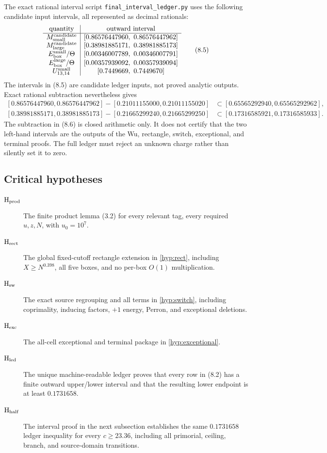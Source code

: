 \documentclass[11pt]{article}
\theoremstyle{definition}
\newcommand{\cert}[1]{\texttt{#1}}
\begin{document}
The exact rational interval script \cert{final\_interval\_ledger.py} uses
the following candidate input intervals, all represented as decimal
rationals:
\[
\begin{array}{c|c}
\text{quantity}&\text{outward interval}\\
\hline
M_{\rm small}^{\rm candidate}
 &[0.86576447960,\ 0.86576447962]\\
M_{\rm large}^{\rm candidate}
 &[0.38981885171,\ 0.38981885173]\\
E_{\rm box}^{\rm small}/\Theta
 &[0.00346007789,\ 0.00346007791]\\
E_{\rm box}^{\rm large}/\Theta
 &[0.00357939092,\ 0.00357939094]\\
U_{13,14}^{\rm small}&[0.7449669,\ 0.7449670]
\end{array}
\tag{8.5}
\]
The intervals in (8.5) are candidate ledger inputs, not proved analytic
outputs.  Exact rational subtraction nevertheless gives
\small
\[
\begin{aligned}
 [0.86576447960,0.86576447962]
 -[0.21011155000,0.21011155020]
 &\subset[0.65565292940,0.65565292962],\\
 [0.38981885171,0.38981885173]
 -[0.21665299240,0.21665299250]
 &\subset[0.17316585921,0.17316585933].
\end{aligned}
\tag{8.6}
\]
\normalsize
The subtraction in (8.6) is closed arithmetic only.  It does not certify
that the two left-hand intervals are the outputs of the Wu, rectangle,
switch, exceptional, and terminal proofs.  The full ledger must reject an
unknown charge rather than silently set it to zero.

\subsection{Critical hypotheses}
\label{sec:critical-hypotheses}

\begin{description}
\item[\(\mathrm{H}_{\rm prod}\)] The finite product lemma (3.2) for every
relevant tag, every required \(u,z,N\), with \(u_0=10^7\).
\item[\(\mathrm{H}_{\rm rect}\)] The global fixed-cutoff rectangle
extension in \cref{hyp:rect}, including \(X\ge N^{0.398}\), all five
boxes, and no per-box \(O(1)\) multiplication.
\item[\(\mathrm{H}_{\rm sw}\)] The exact source regrouping and all terms in
\cref{hyp:switch}, including coprimality, inducing factors, \(+1\) energy,
Perron, and exceptional deletions.
\item[\(\mathrm{H}_{\rm exc}\)] The all-cell exceptional and terminal
package in \cref{hyp:exceptional}.
\item[\(\mathrm{H}_{\rm led}\)] The unique machine-readable ledger proves
that every row in (8.2) has a finite outward upper/lower interval and that
the resulting lower endpoint is at least \(0.1731658\).
\item[\(\mathrm{H}_{\rm half}\)] The interval proof in the next subsection
establishes the same \(0.1731658\) ledger inequality for every
\(c\ge23.36\), including all
primorial, ceiling, branch, and source-domain transitions.
\end{description}
\end{document}
